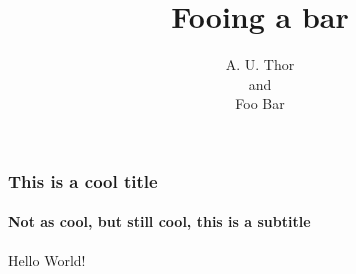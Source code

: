 \documentclass{beamer}
\author[thor,bar]{A. U. Thor\\and\\Foo Bar}
\title{Fooing a bar}
\begin{document}
  \begin{frame}
    \maketitle
  \end{frame}
  \begin{frame}
    \frametitle{This is a cool title}
    \framesubtitle{Not as cool, but still cool, this is a subtitle}
    Hello World!
  \end{frame}
\end{document}
